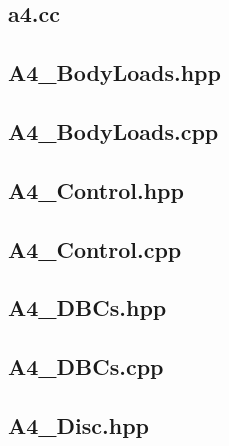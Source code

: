 \documentclass[a4paper, 12pt]{article}
\begin{document}
\subsection{a4.cc} \label{subsec:a4.cc}


\subsection{A4\_BodyLoads.hpp} \label{subsec:BLhpp}


\subsection{A4\_BodyLoads.cpp} \label{subsec:BLcpp}


\subsection{A4\_Control.hpp} \label{subsec:Cont.hpp}


\subsection{A4\_Control.cpp} \label{subsec:Cont.cpp}


\subsection{A4\_DBCs.hpp} \label{subsec:DBCs.hpp}


\subsection{A4\_DBCs.cpp} \label{subsec:DBCs.cpp}


\subsection{A4\_Disc.hpp} \label{subsec:Disc.hpp}

\end{document}
